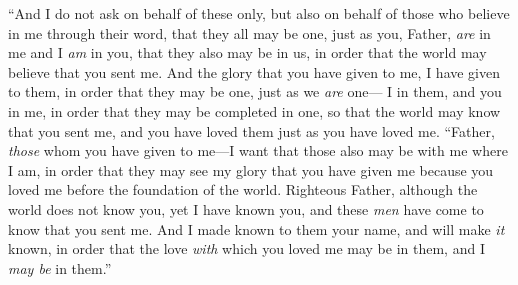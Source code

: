 \begin{biblechapter}
 “And I do not ask on behalf of these only, but also on behalf of those who believe in me through their word,
\verse that they all may be one, just as you, Father, \textit{are} in me and I \textit{am} in you, that they also may be in us, in order that the world may believe that you sent me.
\verse And the glory that you have given to me, I have given to them, in order that they may be one, just as we \textit{are} one—
\verse I in them, and you in me, in order that they may be completed in one, so that the world may know that you sent me, and you have loved them just as you have loved me.
\verse “Father, \textit{those} whom you have given to me—I want that those also may be with me where I am, in order that they may see my glory that you have given me because you loved me before the foundation of the world.
\verse Righteous Father, although the world does not know you, yet I have known you, and these \textit{men} have come to know that you sent me.
\verse And I made known to them your name, and will make \textit{it} known, in order that the love \textit{with} which you loved me may be in them, and I \textit{may be} in them.”
\end{biblechapter}

